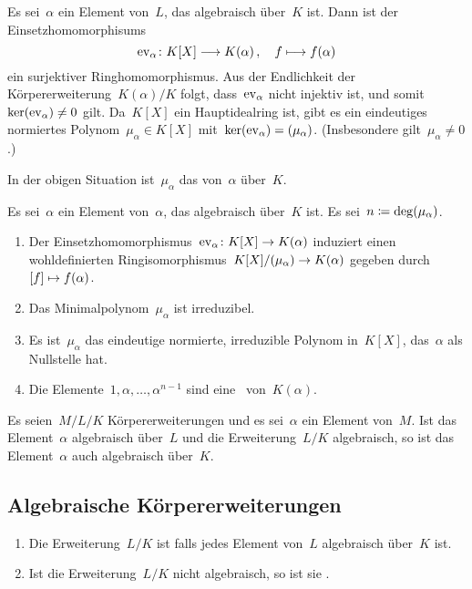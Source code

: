 Es sei~$\alpha$ ein Element von~$L$, das algebraisch über~$K$ ist.
Dann ist der Einsetzhomomorphisums
\[
  \ev_\alpha
  \colon
  K[X] \to K(\alpha) \,,
  \quad
  f \mapsto f(\alpha)
\]
ein surjektiver Ringhomomorphismus.
Aus der Endlichkeit der Körpererweiterung~$K(\alpha)/K$ folgt, dass~$\operatorname{ev}_\alpha$ nicht injektiv ist, und somit~$\ker(\operatorname{ev}_\alpha) \neq 0$ gilt.
Da~$K[X]$ ein Hauptidealring ist, gibt es ein eindeutiges normiertes Polynom~$\mu_\alpha \in K[X]$ mit~$\ker(\operatorname{ev}_\alpha) = ( \mu_\alpha )$.
(Insbesondere gilt~$\mu_\alpha \neq 0$.)

\begin{definition}
  In der obigen Situation ist~$\mu_\alpha$ das  von~$\alpha$ über~$K$.
\end{definition}

\begin{proposition}
  Es sei~$\alpha$ ein Element von~$\alpha$, das algebraisch über~$K$ ist.
  Es sei~$n \coloneqq \deg(\mu_\alpha)$.
  \begin{enumerate}
    \item
      Der Einsetzhomomorphismus~$\ev_\alpha \colon K[X] \to K(\alpha)$ induziert einen wohldefinierten Ringisomorphismus~$K[X] / \genideal{\mu_\alpha} \to K(\alpha)$ gegeben durch~$\class{f} \mapsto f(\alpha)$.
    \item
      Das Minimalpolynom~$\mu_\alpha$ ist irreduzibel.
    \item
      Es ist~$\mu_\alpha$ das eindeutige normierte, irreduzible Polynom in~$K[X]$, das~$\alpha$ als Nullstelle hat.
    \item
      Die Elemente~$1, \alpha, \dotsc, \alpha^{n-1}$ sind eine~ von~$K(\alpha)$.
  \end{enumerate}
\end{proposition}

\begin{proposition}
  Es seien~$M/L/K$ Körpererweiterungen und es sei~$\alpha$ ein Element von~$M$.
  Ist das Element~$\alpha$ algebraisch über~$L$ und die Erweiterung~$L/K$ algebraisch, so ist das Element~$\alpha$ auch algebraisch über~$K$.
\end{proposition}


\subsection{Algebraische Körpererweiterungen}

\begin{definition}
  \leavevmode
  \begin{enumerate}
    \item
      Die Erweiterung~$L/K$ ist  falls jedes Element von~$L$ algebraisch über~$K$ ist.
    \item
      Ist die Erweiterung~$L/K$ nicht algebraisch, so ist sie .
  \end{enumerate}
\end{definition}

